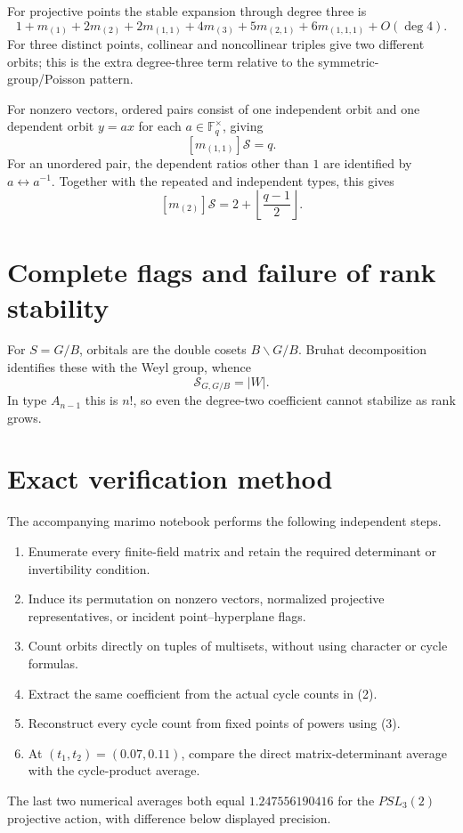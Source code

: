 \documentclass[10pt]{article}
\newcommand{\F}{\mathbb F}
\newcommand{\Sg}{\mathcal S}
\begin{document}
For projective points the stable expansion through degree three is
\begin{equation}
 1+m_{(1)}+2m_{(2)}+2m_{(1,1)}
 +4m_{(3)}+5m_{(2,1)}+6m_{(1,1,1)}+O(\deg4).
\end{equation}
For three distinct points, collinear and noncollinear triples give two
different orbits; this is the extra degree-three term relative to the
symmetric-group/Poisson pattern.

For nonzero vectors, ordered pairs consist of one independent orbit and one
dependent orbit $y=ax$ for each $a\in\F_q^\times$, giving
\[
 [m_{(1,1)}]\Sg=q.
\]
For an unordered pair, the dependent ratios other than $1$ are identified by
$a\leftrightarrow a^{-1}$.  Together with the repeated and independent types,
this gives
\[
 [m_{(2)}]\Sg=2+\left\lfloor\frac{q-1}{2}\right\rfloor.
\]

\section{Complete flags and failure of rank stability}
For $S=G/B$, orbitals are the double cosets $B\backslash G/B$.  Bruhat
decomposition identifies these with the Weyl group, whence
\begin{equation}
 [m_{(1,1)}]\Sg_{G,G/B}=|W|.
\end{equation}
In type $A_{n-1}$ this is $n!$, so even the degree-two coefficient cannot
stabilize as rank grows.

\section{Exact verification method}
The accompanying marimo notebook performs the following independent steps.
\begin{enumerate}
 \item Enumerate every finite-field matrix and retain the required determinant
 or invertibility condition.
 \item Induce its permutation on nonzero vectors, normalized projective
 representatives, or incident point--hyperplane flags.
 \item Count orbits directly on tuples of multisets, without using character
 or cycle formulas.
 \item Extract the same coefficient from the actual cycle counts in (2).
 \item Reconstruct every cycle count from fixed points of powers using (3).
 \item At $(t_1,t_2)=(0.07,0.11)$, compare the direct matrix-determinant
 average with the cycle-product average.
\end{enumerate}
The last two numerical averages both equal $1.247556190416$ for the
$PSL_3(2)$ projective action, with difference below displayed precision.
\end{document}
